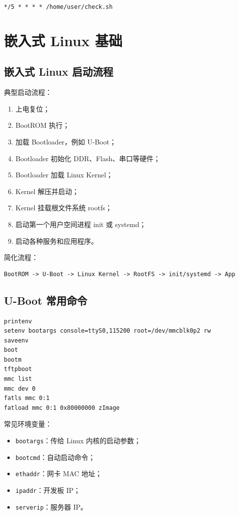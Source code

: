 \documentclass[UTF8,a4paper,12pt]{ctexart}
\begin{document}
\begin{lstlisting}
*/5 * * * * /home/user/check.sh
\end{lstlisting}

\section{嵌入式 Linux 基础}

\subsection{嵌入式 Linux 启动流程}

典型启动流程：

\begin{enumerate}
    \item 上电复位；
    \item BootROM 执行；
    \item 加载 Bootloader，例如 U-Boot；
    \item Bootloader 初始化 DDR、Flash、串口等硬件；
    \item Bootloader 加载 Linux Kernel；
    \item Kernel 解压并启动；
    \item Kernel 挂载根文件系统 rootfs；
    \item 启动第一个用户空间进程 init 或 systemd；
    \item 启动各种服务和应用程序。
\end{enumerate}

简化流程：

\begin{lstlisting}
BootROM -> U-Boot -> Linux Kernel -> RootFS -> init/systemd -> App
\end{lstlisting}

\subsection{U-Boot 常用命令}

\begin{lstlisting}
printenv
setenv bootargs console=ttyS0,115200 root=/dev/mmcblk0p2 rw
saveenv
boot
bootm
tftpboot
mmc list
mmc dev 0
fatls mmc 0:1
fatload mmc 0:1 0x80000000 zImage
\end{lstlisting}

常见环境变量：
\begin{itemize}
    \item \texttt{bootargs}：传给 Linux 内核的启动参数；
    \item \texttt{bootcmd}：自动启动命令；
    \item \texttt{ethaddr}：网卡 MAC 地址；
    \item \texttt{ipaddr}：开发板 IP；
    \item \texttt{serverip}：服务器 IP。
\end{itemize}
\end{document}
